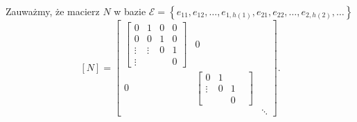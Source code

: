 \documentclass[../main.tex]{subfiles}
\begin{document}
Zauważmy, że macierz $N$ w bazie $\mathcal{E} = \left\{ e_{11},e_{12},\ldots,e_{1,h(1)},e_{21},e_{22},\ldots,e_{2,h(2)},\ldots \right\} $
\[
    [N] = \begin{bmatrix} \begin{bmatrix} 0&1&0&0\\ 0&0&1&0\\\vdots&\vdots&0&1\\ \vdots & &&0 \end{bmatrix}& 0 & \\ 0 & \begin{bmatrix} 0&1&&\\ \vdots & 0 &1 \\ & & 0 \end{bmatrix}  & \\ &&\ddots \end{bmatrix}
.\]
\end{document}
